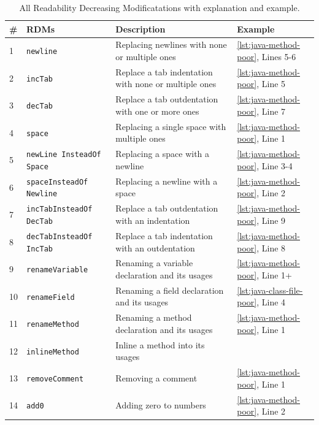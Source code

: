 \documentclass[%
class=scrreprt,
chapterprefix=false,%
open=right,%
twoside=false,%
paper=a4,%
logofile={Logo\_zentral\_farbig\_EN.png},%
thesistype=master,%
UKenglish,%
]{se2thesis}
\theoremstyle{definition}
\newcommand{\Mods}{Modificatations\xspace}
\newcommand{\RDHs}{Readability Decreasing \Mods\xspace}
\newcommand{\rdhs}{RDMs\xspace}
\begin{document}
	\begin{table}[p]
		\centering
		\caption{All \RDHs with explanation and example.}
		\label{tab:rdh-description}
		\begin{tabular}{|p{}|p{}|p{}|p{}|}
			\hline
			\textbf{\#} & \textbf{\rdhs} & \textbf{Description} & \textbf{Example} \\
			\hline
			1 & \texttt{newline} & Replacing newlines with none or multiple ones & \autoref{lst:java-method-poor}, Lines 5-6 \\
			\hline
			2 & \texttt{incTab} & Replace a tab indentation with none or multiple ones & \autoref{lst:java-method-poor}, Line 5 \\
			\hline
			3 & \texttt{decTab} & Replace a tab outdentation with one or more ones & \autoref{lst:java-method-poor}, Line 7 \\
			\hline
			4 & \texttt{space} & Replacing a single space with multiple ones & \autoref{lst:java-method-poor}, Line 1 \\
			\hline
			5 & \texttt{newLine InsteadOf Space} & Replacing a space with a newline & \autoref{lst:java-method-poor}, Line 3-4 \\
			\hline
			6 & \texttt{spaceInsteadOf Newline} & Replacing a newline with a space & \autoref{lst:java-method-poor}, Line 2 \\
			\hline
			7 & \texttt{incTabInsteadOf DecTab} & Replace a tab outdentation with an indentation & \autoref{lst:java-method-poor}, Line 9 \\
			\hline
			8 & \texttt{decTabInsteadOf IncTab} & Replace a tab indentation with an outdentation & \autoref{lst:java-method-poor}, Line 8 \\
			\hline
			9 & \texttt{renameVariable} & Renaming a variable declaration and its usages & \autoref{lst:java-method-poor}, Line 1+ \\
			\hline
			10 & \texttt{renameField} & Renaming a field declaration and its usages & \autoref{lst:java-class-file-poor}, Line 4 \\
			\hline
			11 & \texttt{renameMethod} & Renaming a method declaration and its usages & \autoref{lst:java-method-poor}, Line 1 \\
			\hline
			12 & \texttt{inlineMethod} & Inline a method into its usages &  \\
			\hline
			13 & \texttt{removeComment} & Removing a comment & \autoref{lst:java-method-poor}, Line 1 \\
			\hline
			14 & \texttt{add0} & Adding zero to numbers & \autoref{lst:java-method-poor}, Line 2 \\

\end{tabular}
\end{table}
\end{document}
